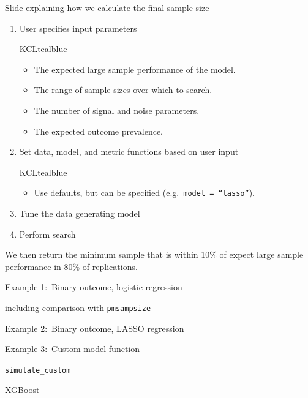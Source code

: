 \documentclass[11pt]{beamer}
\newcommand{\gap}{\vspace{0.8em}}
\begin{document}
\begin{frame}[t]{Slide explaining how we calculate the final sample size}
	\begin{enumerate}
		\item User specifies input parameters
		      \begin{cbox}{KCLtealblue}{}
			      \begin{itemize}
				      \item The expected large sample performance of the
				            model.
				      \item The range of sample sizes over which to search.
				      \item The number of signal and noise parameters.
				      \item The expected outcome prevalence.
			      \end{itemize}
		      \end{cbox}
		\item Set data, model, and metric functions based on user input
		      \begin{cbox}{KCLtealblue}{}
			      \begin{itemize}
				      \item Use defaults, but can be specified (e.g.\
				            \texttt{model = ``lasso''}).
			      \end{itemize}
		      \end{cbox}

		\item Tune the data generating model
		\item Perform search
	\end{enumerate}

	\gap

	We then return the minimum sample that is within 10\% of expect large
	sample performance in 80\% of replications.

\end{frame}

\begin{frame}[t]{Example 1:\ Binary outcome, logistic regression }

including comparison with \texttt{pmsampsize}

\end{frame}

\begin{frame}[t]{Example 2:\ Binary outcome, LASSO regression }

\end{frame}

\begin{frame}[t]{Example 3:\ Custom model function}

\texttt{simulate\_custom}

XGBoost

\end{frame}
\end{document}
